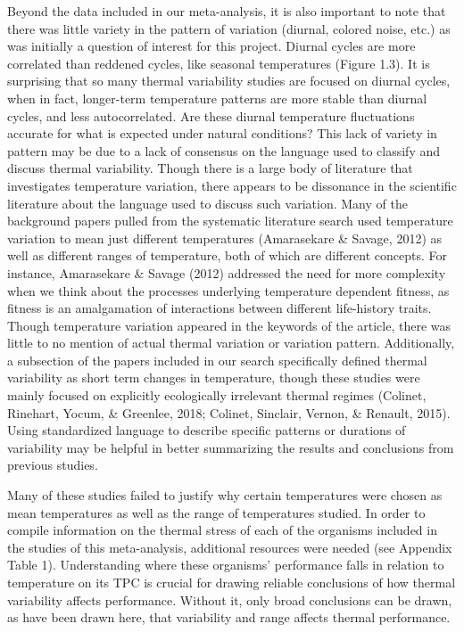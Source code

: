 \documentclass[12pt,twoside]{reedthesis}
\begin{document}
Beyond the data included in our meta-analysis, it is also important to note that there was little variety in the pattern of variation (diurnal, colored noise, etc.) as was initially a question of interest for this project. Diurnal cycles are more correlated than reddened cycles, like seasonal temperatures (Figure 1.3). It is surprising that so many thermal variability studies are focused on diurnal cycles, when in fact, longer-term temperature patterns are more stable than diurnal cycles, and less autocorrelated. Are these diurnal temperature fluctuations accurate for what is expected under natural conditions? This lack of variety in pattern may be due to a lack of consensus on the language used to classify and discuss thermal variability. Though there is a large body of literature that investigates temperature variation, there appears to be dissonance in the scientific literature about the language used to discuss such variation. Many of the background papers pulled from the systematic literature search used temperature variation to mean just different temperatures (Amarasekare \& Savage, 2012) as well as different ranges of temperature, both of which are different concepts. For instance, Amarasekare \& Savage (2012) addressed the need for more complexity when we think about the processes underlying temperature dependent fitness, as fitness is an amalgamation of interactions between different life-history traits. Though temperature variation appeared in the keywords of the article, there was little to no mention of actual thermal variation or variation pattern. Additionally, a subsection of the papers included in our search specifically defined thermal variability as short term changes in temperature, though these studies were mainly focused on explicitly ecologically irrelevant thermal regimes (Colinet, Rinehart, Yocum, \& Greenlee, 2018; Colinet, Sinclair, Vernon, \& Renault, 2015). Using standardized language to describe specific patterns or durations of variability may be helpful in better summarizing the results and conclusions from previous studies.

Many of these studies failed to justify why certain temperatures were chosen as mean temperatures as well as the range of temperatures studied. In order to compile information on the thermal stress of each of the organisms included in the studies of this meta-analysis, additional resources were needed (see Appendix Table 1). Understanding where these organisms' performance falls in relation to temperature on its TPC is crucial for drawing reliable conclusions of how thermal variability affects performance. Without it, only broad conclusions can be drawn, as have been drawn here, that variability and range affects thermal performance.
\end{document}
